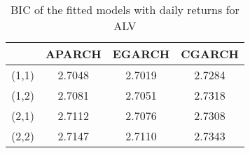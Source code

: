 \begin{table}[!h]
 \small
  \centering
  \vspace{2ex} 
\begin{tabular}{c|c|c|c}
\toprule
	         &	APARCH	& EGARCH	& CGARCH	\\
\midrule
\hline		 

(1,1)&	2.7048	& 2.7019	&2.7284	 \\
(1,2)&	2.7081	& 2.7051	&2.7318	 \\
(2,1)&	2.7112	& 2.7076	&2.7308	 \\
(2,2)&	2.7147	& 2.7110	&2.7343	 \\
\bottomrule

\end{tabular}
  \caption{BIC of the fitted models with daily returns for ALV}
  \label{tab:dailyBICforALV}
\end{table}




